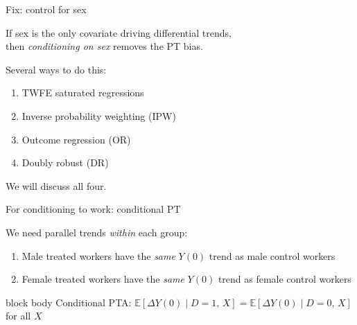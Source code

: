 \documentclass[aspectratio=169,11pt]{beamer}
\newcommand{\emphbox}[1]{%
  \begin{beamercolorbox}[rounded=true,sep=7pt,wd=\linewidth]{block body}%
    \small\color{slate} #1%
  \end{beamercolorbox}}
\begin{document}
\begin{frame}{Fix: control for sex}
\vspace{0.6em}
\begin{center}
If sex is the only covariate driving differential trends,\\
then \emph{conditioning on sex} removes the PT bias.
\end{center}
\vspace{0.6em}
\begin{center}
Several ways to do this:
\end{center}
\vspace{0.3em}
\begin{enumerate}\setlength\itemsep{0.4em}
  \item TWFE saturated regressions
  \item Inverse probability weighting (IPW)
  \item Outcome regression (OR)
  \item Doubly robust (DR)
\end{enumerate}
\vspace{0.5em}
\begin{center}\color{warmgray}\small
We will discuss all four.
\end{center}
\end{frame}

\begin{frame}{For conditioning to work: conditional PT}
\vspace{0.6em}
\begin{center}
We need parallel trends \emph{within} each group:
\end{center}
\vspace{0.4em}
\begin{enumerate}\setlength\itemsep{0.5em}
  \item Male treated workers have the \emph{same} $Y(0)$ trend as male control workers
  \item Female treated workers have the \emph{same} $Y(0)$ trend as female control workers
\end{enumerate}
\vspace{0.6em}
\emphbox{Conditional PTA: \;\;
$\mathbb{E}[\Delta Y(0)\mid D{=}1,\,X] = \mathbb{E}[\Delta Y(0)\mid D{=}0,\,X]$
\quad for all $X$}
\end{frame}

\end{document}
